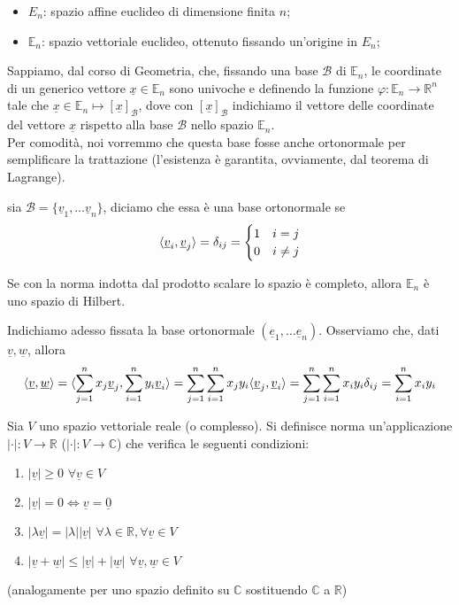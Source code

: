 	\begin{itemize}
		\item $E_n$: spazio affine euclideo di dimensione finita $n$;
		\item $\mathbb{E}_n$: spazio vettoriale euclideo, ottenuto fissando un'origine in $E_n$;
	\end{itemize}
	Sappiamo, dal corso di Geometria, che, fissando una base $\mathcal{B}$ di $\mathbb{E}_n$, le coordinate di un generico vettore $\underline{x} \in \mathbb{E}_n$ sono univoche e definendo la funzione $\varphi: \mathbb{E}_n \to \mathbb{R}^n$ tale che $\underline{x} \in \mathbb{E}_n \mapsto [\underline{x}]_{\mathcal{B}}$, dove con $[\underline{x}]_{\mathcal{B}}$ indichiamo il vettore delle coordinate del vettore $\underline{x}$ rispetto alla base $\mathcal{B}$ nello spazio $\mathbb{E}_n$. \\
Per comodità, noi vorremmo che questa base fosse anche ortonormale per semplificare la trattazione (l'esistenza è garantita, ovviamente, dal teorema di Lagrange). 
\begin{definition}
	sia $\mathcal{B} = \{ \underline{v}_1, \ldots \underline{v}_n \}$, diciamo che essa è una base ortonormale se
	$$
	\langle \underline{v}_i, \underline{v}_j \rangle = \delta_{ij} = \begin{cases} 1 & i = j \\ 0 & i \neq j \end{cases}	
	$$
\end{definition}
\begin{remark}
	Se con la norma indotta dal prodotto scalare lo spazio è completo, allora $\mathbb{E}_n$ è uno spazio di Hilbert.
\end{remark}
\noindent Indichiamo adesso fissata la base ortonormale $(\underline{e}_1, \ldots \underline{e}_n)$. Osserviamo che, dati $\underline{v}, \underline{w}$, allora
$$
\langle \underline{v}, \underline{w} \rangle = \langle \sum_{j=1}^n x_j \underline{v}_j, \sum_{i=1}^n y_i \underline{v}_i \rangle = \sum_{j=1}^n \sum_{i=1}^n x_j y_i \langle \underline{v}_j, \underline{v}_i \rangle = \sum_{j=1}^n \sum_{i=1}^n x_i y_i \delta_{ij} = \sum_{i=1}^n x_i y_i
$$
\begin{definition}[norma]
	Sia $V$ uno spazio vettoriale reale (o complesso). Si definisce norma un'applicazione $| \cdot |: V \to \mathbb{R}$ ($| \cdot |: V \to \mathbb{C}$) che verifica le seguenti condizioni:
	\begin{enumerate}[label=\protect\circled{\arabic*}]
		\item $|\underline{v}| \geq 0 \, \, \forall \underline{v} \in V$
		\item $| \underline{v} | = 0 \iff \underline{v} = \underline{0}$
		\item $| \lambda \underline{v} | = | \lambda | | \underline{v} | \, \, \forall \lambda \in \mathbb{R}, \forall \underline{v} \in V$
		\item $| \underline{v} + \underline{w} | \leq | \underline{v} | + | \underline{w} | \, \, \forall \underline{v}, \underline{w} \in V$
	\end{enumerate}
	(analogamente per uno spazio definito su $\mathbb{C}$ sostituendo $\mathbb{C}$ a $\mathbb{R}$)
\end{definition}
